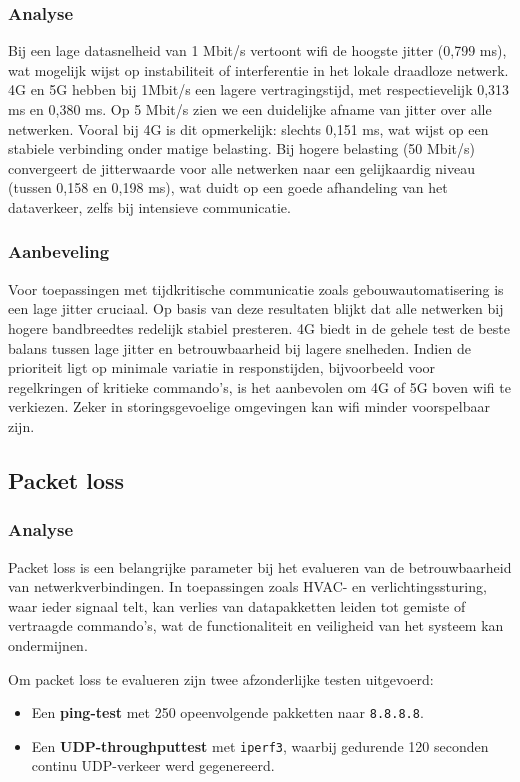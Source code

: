 \subsubsection{Analyse}
Bij een lage datasnelheid van 1 Mbit/s vertoont wifi de hoogste jitter (0,799 ms), wat mogelijk wijst op instabiliteit of interferentie in het lokale draadloze netwerk. 4G en 5G hebben bij 1Mbit/s een lagere vertragingstijd, met respectievelijk 0,313 ms en 0,380 ms. Op 5 Mbit/s zien we een duidelijke afname van jitter over alle netwerken. Vooral bij 4G is dit opmerkelijk: slechts 0,151 ms, wat wijst op een stabiele verbinding onder matige belasting. Bij hogere belasting (50 Mbit/s) convergeert de jitterwaarde voor alle netwerken naar een gelijkaardig niveau (tussen 0,158 en 0,198 ms), wat duidt op een goede afhandeling van het dataverkeer, zelfs bij intensieve communicatie. 

\subsubsection{Aanbeveling }
Voor toepassingen met tijdkritische communicatie zoals gebouwautomatisering is een lage jitter cruciaal. Op basis van deze resultaten blijkt dat alle netwerken bij hogere bandbreedtes redelijk stabiel presteren. 4G biedt in de gehele test de beste balans tussen lage jitter en betrouwbaarheid bij lagere snelheden. Indien de prioriteit ligt op minimale variatie in responstijden, bijvoorbeeld voor regelkringen of kritieke commando’s, is het aanbevolen om 4G of 5G boven wifi te verkiezen. Zeker in storingsgevoelige omgevingen kan wifi minder voorspelbaar zijn.


\subsection{Packet loss}

\subsubsection{Analyse}
Packet loss is een belangrijke parameter bij het evalueren van de betrouwbaarheid van netwerkverbindingen. In toepassingen zoals HVAC- en verlichtingssturing, waar ieder signaal telt, kan verlies van datapakketten leiden tot gemiste of vertraagde commando’s, wat de functionaliteit en veiligheid van het systeem kan ondermijnen.

Om packet loss te evalueren zijn twee afzonderlijke testen uitgevoerd:
\begin{itemize}
    \item Een \textbf{ping-test} met 250 opeenvolgende pakketten naar \texttt{8.8.8.8}.
    \item Een \textbf{UDP-throughputtest} met \texttt{iperf3}, waarbij gedurende 120 seconden continu UDP-verkeer werd gegenereerd.
\end{itemize}

